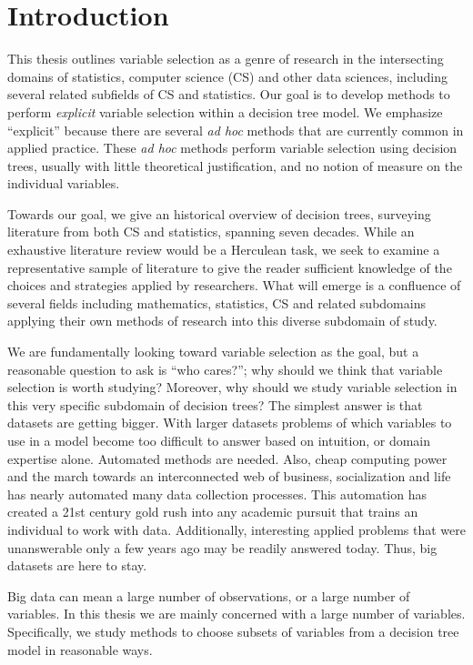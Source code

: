 \chapter{Introduction}
\label{ch:intro}

This thesis outlines variable selection as a genre of research in the intersecting domains of statistics, computer science (CS) and other data sciences, including several related subfields of CS  and statistics. Our goal is to develop methods to perform \emph{explicit} variable selection within a decision tree model. We emphasize ``explicit'' because there are several \emph{ad hoc} methods that are currently common in applied practice. These \emph{ad hoc} methods perform variable selection using decision trees, usually with little theoretical justification, and no notion of measure on the individual variables. 

Towards our goal, we give an historical overview of decision trees, surveying literature from both CS and statistics, spanning seven decades. While an exhaustive literature review would be a Herculean task, we seek to examine a representative sample of literature to give the reader sufficient knowledge of the choices and strategies applied by researchers. 
What will emerge is a confluence of several fields including mathematics, statistics, CS and related subdomains applying their own methods of research into this diverse subdomain of study.     

We are fundamentally looking toward variable selection as the goal, but a reasonable question to ask is ``who cares?''; why should we think that variable selection is worth studying? Moreover, why should we study variable selection in this very specific subdomain of decision trees? The simplest answer is that datasets are getting bigger. With larger datasets problems of which variables to use in a model become too difficult to answer based on intuition, or domain expertise alone. Automated methods are needed. Also, cheap computing power and the march towards an interconnected web of business, socialization and life has nearly automated many data collection processes. This automation has created a 21st century gold rush into any academic pursuit that trains an individual to work with data. Additionally, interesting applied problems that were unanswerable only a few years ago may be readily answered today. 
Thus, big datasets are here to stay.

 Big data can mean a large number of observations, or a large number of variables. In this thesis we are mainly concerned with a large number of variables. Specifically, we study methods to choose subsets of variables from a decision tree model in reasonable ways. 

